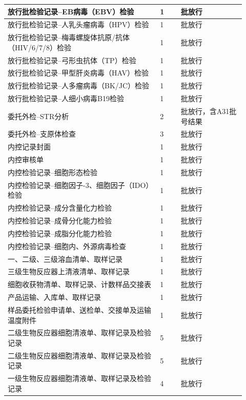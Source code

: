 \documentclass[UTF8,10pt,a4paper,fontset=fandol]{ctexart}
\newcommand{\fieldvalue}[1]{#1}
\newcommand{\handwritten}[1]{#1}
\begin{document}
\begin{center}
\begin{tabular}{|p{0.59\linewidth}|p{0.08\linewidth}|p{0.25\linewidth}|}
放行批检验记录--EB病毒（EBV）检验 & 1 & 批放行 \\ \hline
放行批检验记录--人乳头瘤病毒（HPV）检验 & 1 & 批放行 \\ \hline
放行批检验记录--梅毒螺旋体抗原/抗体（HIV/6/7/8）检验 & 1 & 批放行 \\ \hline
放行批检验记录--弓形虫抗体（TP）检验 & 1 & 批放行 \\ \hline
放行批检验记录--甲型肝炎病毒（HAV）检验 & 1 & 批放行 \\ \hline
放行批检验记录--人多瘤病毒（BK/JC）检验 & 1 & 批放行 \\ \hline
放行批检验记录--人细小病毒B19检验 & 1 & 批放行 \\ \hline
委托外检--STR分析 & 2 & 批放行，含A31批号结果 \\ \hline
委托外检--支原体检查 & 3 & 批放行 \\ \hline
内控记录封面 & 1 & 批放行 \\ \hline
内控审核单 & 1 & 批放行 \\ \hline
内控检验记录--细胞形态检验 & 1 & 批放行 \\ \hline
内控检验记录--细胞因子-3、细胞因子（IDO）检验 & 1 & 批放行 \\ \hline
内控检验记录--成分含量化力检验 & 1 & 批放行 \\ \hline
内控检验记录--成骨分化能力检验 & 1 & 批放行 \\ \hline
内控检验记录--成脂分化能力检验 & 1 & 批放行 \\ \hline
内控检验记录--细胞内、外源病毒检查 & 1 & 批放行 \\ \hline
一、二级、三级溶血清单、取样记录 & 1 & 批放行 \\ \hline
三级生物反应器上清液清单、取样记录 & 1 & 批放行 \\ \hline
细胞收获物清单、取样记录、计数样品交接表 & 1 & 批放行 \\ \hline
产品运输、入库单、取样记录 & 1 & 批放行 \\ \hline
样品委托检验申请单、送检单、交接单及运输温度附件 & 1 & 批放行 \\ \hline
二级生物反应器细胞清液单、取样记录及检验记录 & 5 & 批放行 \\ \hline
二级生物反应器细胞清液单、取样记录及检验记录 & 5 & 批放行 \\ \hline
一级生物反应器细胞清液单、取样记录及检验记录 &
\fieldvalue{\handwritten{4}} &
批放行 \\ \hline
\end{tabular}
\end{center}
\end{document}
